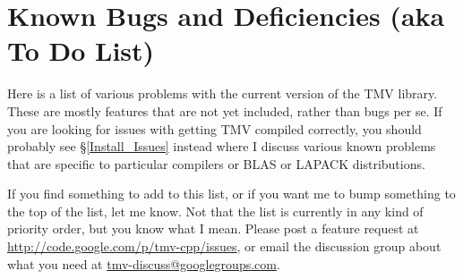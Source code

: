 \documentclass[twoside,letterpaper,11pt]{article}
\makeatletter
\newcommand{\mygroupx}{tmv-discuss@googlegroups.com}
\newcommand{\mygroup}{\href{mailto:\mygroupx}{\mygroupx}}
\newcommand{\myissuesx}{http://code.google.com/p/tmv-cpp/issues}
\newcommand{\myissues}{\url{\myissuesx}}
\makeatother
\begin{document}

\newpage
\section{Known Bugs and Deficiencies (aka To Do List)}
\label{Bugs}

Here is a list of various problems with the current version of the TMV library.
These are mostly features that are not yet included, rather than bugs per se.
If you are looking for issues with getting TMV compiled correctly, you should
probably see \S\ref{Install_Issues} instead where I discuss various known
problems that are specific to particular compilers or BLAS or LAPACK 
distributions.  

If you find something to add to this list, or if you want me to bump something
to the top of the list, let me know.  Not that the list is currently in any kind of 
priority order, but you know what I mean.  Please post a feature request
at \myissues, or email the discussion group about what you need at \mygroup.
\end{document}
